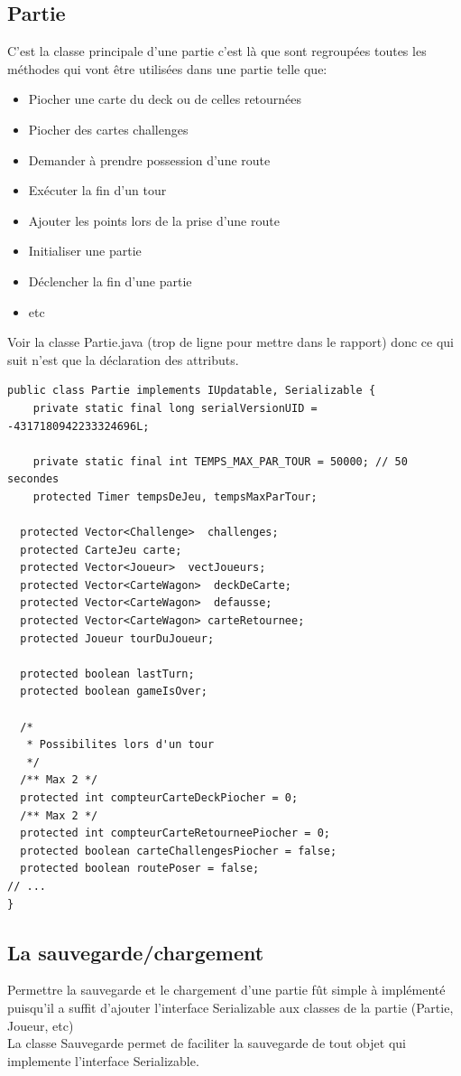 \documentclass{report}
\begin{document}
\subsection{Partie} \label{defPartie}
C'est la classe principale d'une partie c'est là que sont regroupées toutes les méthodes qui vont être utilisées dans une partie telle que:
\begin{itemize}
\item Piocher une carte du deck ou de celles retournées
\item Piocher des cartes challenges
\item Demander à prendre possession d'une route
\item Exécuter la fin d'un tour
\item Ajouter les points lors de la prise d'une route
\item Initialiser une partie
\item Déclencher la fin d'une partie
\item etc
\end{itemize}
Voir la classe Partie.java (trop de ligne pour mettre dans le rapport) donc ce qui suit n'est que la déclaration des attributs.
\begin{lstlisting}[caption=Les attributs d'une partie]
public class Partie implements IUpdatable, Serializable {
	private static final long serialVersionUID = -4317180942233324696L;
	
	private static final int TEMPS_MAX_PAR_TOUR = 50000; // 50 secondes
	protected Timer tempsDeJeu, tempsMaxParTour;

  protected Vector<Challenge>  challenges;
  protected CarteJeu carte;
  protected Vector<Joueur>  vectJoueurs;
  protected Vector<CarteWagon>  deckDeCarte;
  protected Vector<CarteWagon>  defausse;
  protected Vector<CarteWagon> carteRetournee;
  protected Joueur tourDuJoueur;

  protected boolean lastTurn;
  protected boolean gameIsOver;
  
  /*
   * Possibilites lors d'un tour
   */
  /** Max 2 */
  protected int compteurCarteDeckPiocher = 0;
  /** Max 2 */
  protected int compteurCarteRetourneePiocher = 0;
  protected boolean carteChallengesPiocher = false;
  protected boolean routePoser = false;
// ...
}
\end{lstlisting}

\subsection{La sauvegarde/chargement}
Permettre la sauvegarde et le chargement d'une partie fût simple à implémenté puisqu'il a suffit d'ajouter l'interface Serializable aux classes de la partie (Partie, Joueur, etc)\\
La classe Sauvegarde permet de faciliter la sauvegarde de tout objet qui implemente l'interface Serializable.

\end{document}
